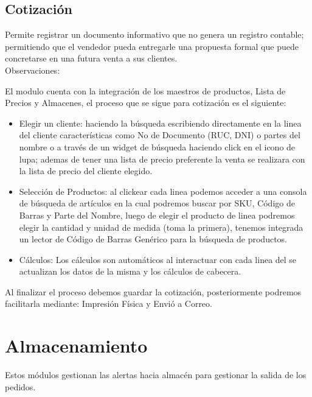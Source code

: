 \documentclass[pdftex,12pt,oneside,a4paper,spanish, english, brazil]{abntex2}
\begin{document}
\begin{sloppypar}
              \subsection{Cotización}
              Permite registrar un documento informativo que no genera un registro contable; permitiendo que el vendedor pueda entregarle una propuesta formal que puede concretarse en una futura venta a sus clientes.\\
              Observaciones:
              
              El modulo cuenta con la integración de los maestros de productos, Lista de Precios y Almacenes, el proceso que se sigue para cotización es el siguiente:
              \begin{itemize}
              	\item Elegir un cliente: haciendo la búsqueda escribiendo directamente en la linea del cliente características como No de Documento (RUC, DNI) o partes del nombre o a través de un widget de búsqueda haciendo click en el icono de lupa; ademas de tener una lista de precio preferente la venta se realizara con la lista de precio del cliente elegido.
              	\item Selección de Productos: al clickear cada linea podemos acceder a una consola de búsqueda de artículos en la cual podremos buscar por SKU, Código de Barras y Parte del Nombre, luego de elegir el producto de linea podremos elegir la cantidad y unidad de medida (toma la primera), tenemos integrada un lector de Código de Barras Genérico para la búsqueda de productos.
              	\item Cálculos: Los cálculos son automáticos al interactuar con cada linea del se actualizan los datos de la misma y los cálculos de cabecera. 
              \end{itemize}
              Al finalizar el proceso debemos guardar la cotización, posteriormente podremos facilitarla mediante: Impresión Física y Envió a Correo.
            \section{Almacenamiento}
            Estos módulos gestionan las alertas hacia almacén para gestionar la salida de los pedidos.

\end{sloppypar}
\end{document}
